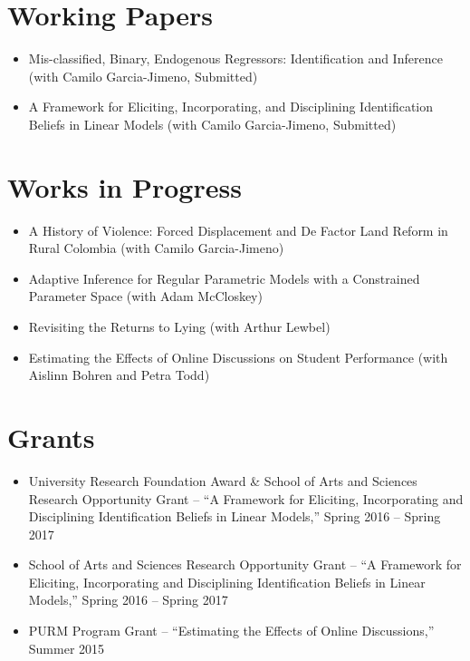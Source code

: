 \documentclass[line,overlapped]{myres}
\begin{document}
\begin{resume}
\section{\sc Working Papers}
\begin{itemize}
  \item Mis-classified, Binary, Endogenous Regressors: Identification and Inference (with Camilo Garcia-Jimeno, Submitted)
	\item A Framework for Eliciting, Incorporating, and Disciplining Identification Beliefs in Linear Models (with Camilo Garcia-Jimeno, Submitted)
\end{itemize}


\section{\sc Works in Progress}
\begin{itemize}
  \item A History of Violence: Forced Displacement and De Factor Land Reform in Rural Colombia (with Camilo Garcia-Jimeno)
  \item Adaptive Inference for Regular Parametric Models with a Constrained Parameter Space (with Adam McCloskey)
  \item Revisiting the Returns to Lying (with Arthur Lewbel)
  \item Estimating the Effects of Online Discussions on Student Performance (with Aislinn Bohren and Petra Todd)
\end{itemize}

\section{\sc Grants}
\begin{itemize}
  \item University Research Foundation Award \& School of Arts and Sciences Research Opportunity Grant  -- ``A Framework for Eliciting, Incorporating and Disciplining Identification Beliefs in Linear Models,'' Spring 2016 -- Spring 2017
  \item School of Arts and Sciences Research Opportunity Grant -- ``A Framework for Eliciting, Incorporating and Disciplining Identification Beliefs in Linear Models,'' Spring 2016 -- Spring 2017   
  \item PURM Program Grant -- ``Estimating the Effects of Online Discussions,'' Summer 2015
\end{itemize}





\end{resume}
\end{document}
